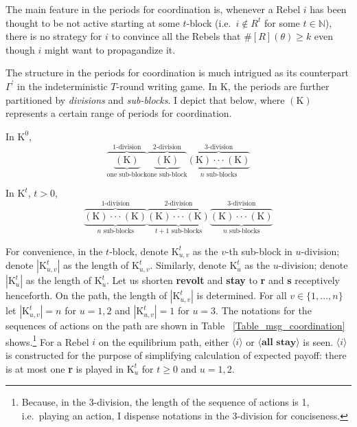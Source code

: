 \documentclass[12pt,letter]{article}
\newcommand{\Kappa}{\mathrm{K}}
\theoremstyle{definition}
\theoremstyle{remark}
\theoremstyle{claim}
\begin{document}
The main feature in the periods for coordination is, whenever a Rebel $i$ has been thought to be not active starting at some $t$-block (i.e.~$i\notin R^t$ for some $t\in \mathbb{N}$), there is no strategy for $i$ to convince all the Rebels that $\#[R](\theta)\geq k$ even though $i$ might want to propagandize it.

The structure in the periods for coordination is much intrigued as its counterpart $\Gamma^{'}$ in the indeterministic $T$-round writing game. In $\Kappa$, the periods are further partitioned by \textit{divisions} and \textit{sub-blocks}. I depict that below, where $(\Kappa)$ represents a certain range of periods for coordination. 



In $\Kappa^0$, 
\[\overbrace{\underbrace{( \Kappa) }_{\text{one sub-block}}}^{\text{$1$-division}} \overbrace{\underbrace{(\Kappa) }_{\text{one sub-block}}}^{\text{$2$-division}} \overbrace{\underbrace{(\Kappa) \cdot \cdot \cdot (\Kappa)}_{\text{$n$ sub-blocks}}}^{\text{$3$-division}}\] 

In $\Kappa^t$, $t>0$,
\[\overbrace{\underbrace{(\Kappa) \cdot \cdot \cdot (\Kappa)}_{\text{$n$ sub-blocks}}}^{\text{$1$-division}} \overbrace{\underbrace{(\Kappa) \cdot \cdot \cdot (\Kappa)}_{\text{$t+1$ sub-blocks}} }^{\text{$2$-division}} \overbrace{\underbrace{(\Kappa) \cdot \cdot \cdot (\Kappa)}_{\text{$n$ sub-blocks}}}^{\text{$3$-division}}\] 




For convenience, in the $t$-block, denote $\Kappa^t_{u,v}$ as the $v$-th sub-block in $u$-division; denote $|\Kappa^t_{u,v} |$ as the length of $\Kappa^t_{u,v}$. Similarly, denote $\Kappa^t_{u}$ as the $u$-division; denote $|\Kappa^t_{u} |$ as the length of $\Kappa^t_{u}$. Let us shorten \textbf{revolt} and \textbf{stay} to \textbf{r} and \textbf{s} receptively henceforth. On the path, the length of $|\Kappa^t_{u,v}|$ is determined. For all $v\in \{1,...,n\}$ let $|\Kappa^t_{u,v}|=n$ for $u=1,2$ and $|\Kappa^t_{u,v}|=1$ for $u=3$. The notations for the sequences of actions on the path are shown in Table ~\ref{Table_msg_coordination} shows.\footnote{Because, in the $3$-division, the length of the sequence of actions is 1, i.e.~playing an action, I dispense notations in the $3$-division for conciseness.}
For a Rebel $i$ on the equilibrium path, either $\langle i \rangle$ or $\langle \textbf{all stay} \rangle$ is seen. $\langle i \rangle$ is constructed for the purpose of simplifying calculation of expected payoff: there is at most one \textbf{r} is played in $\Kappa^t_u$ for $t\geq 0$ and $u=1,2$.    
\end{document}

